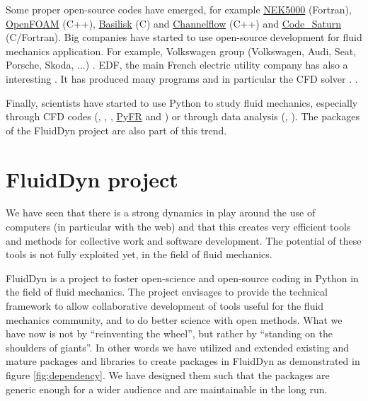 Some proper open-source codes have emerged, for example
\href{https://nek5000.mcs.anl.gov/}{NEK5000} (Fortran),
\href{https://www.openfoam.com/}{OpenFOAM} (C++),
\href{http://basilisk.fr}{Basilisk} (C) and
\href{http://channelflow.org/}{Channelflow} (C++) and
\href{https://www.code-saturne.org}{Code\_Saturn} (C/Fortran).
%
Big companies have started to use open-source development for fluid mechanics
application. For example, Volkswagen group (Volkswagen, Audi, Seat, Porsche,
Skoda, ...) .
%
EDF, the main French electric utility company has also a interesting
. It has produced many programs and in particular the CFD
solver .
%
.

Finally, scientists have started to use Python to study fluid mechanics,
especially through CFD codes (,
,
, \href{http://pyfr.org/}{PyFR}
and ) or through data analysis
(,
).
%
The packages of the FluidDyn project are also part of this trend.

\section{FluidDyn project}
We have seen that there is a strong dynamics in play around the use of
computers (in particular with the web) and that this creates very efficient
tools and methods for collective work and software development.
%
The potential of these tools is not fully exploited yet, in the field of fluid
mechanics.

FluidDyn is a project to foster open-science and open-source coding in Python
in the field of fluid mechanics.
%
The project envisages to provide the technical framework to allow collaborative
development of tools useful for the fluid mechanics community, and to do better
science with open methods.
%
What we have now is not by ``reinventing the wheel'', but rather by ``standing
on the shoulders of giants''. In other words we have utilized and extended
existing and mature packages and libraries to create packages in FluidDyn as
demonstrated in figure \ref{fig:dependency}. We have designed them such that
the packages are generic enough for a wider audience and are maintainable in
the long run.

